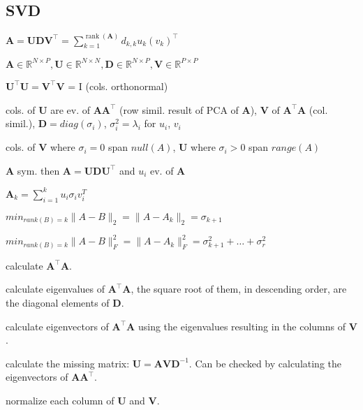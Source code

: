 \documentclass[a4paper, 11pt, landscape]{article}
\begin{document}
\begin{multicols*}{3}
    \section{SVD}
    \begin{inparaitem}[\color{red}\textbullet]
    \item $\mathbf{A} = \mathbf{U} \mathbf{D} \mathbf{V}^\top = \sum_{k=1}^{\operatorname{rank}(\mathbf{A})} d_{k,k} u_k (v_k)^\top$
    \item $\mathbf{A} \in \mathbb{R}^{N \times P}, \mathbf{U} \in \mathbb{R}^{N \times N}, \mathbf{D} \in \mathbb{R}^{N \times P}, \mathbf{V} \in \mathbb{R}^{P \times P}$
    \item $\mathbf{U}^\top \mathbf{U} = \mathbf{V}^\top \mathbf{V}$ = I (cols. orthonormal)
    \item cols. of $\mathbf{U}$ are ev. of $\mathbf{A}\mathbf{A}^\top$ (row simil. result of PCA of $\mathbf{A}$), $\mathbf{V}$ of $\mathbf{A}^\top\mathbf{A}$ (col. simil.), 
        $\mathbf{D} = diag(\sigma_i)$, $\sigma_i^2 = \lambda_i$ for $u_i$, $v_i$  
    \item cols. of $\mathbf{V}$ where $\sigma_i = 0$ span $null(A)$, $\mathbf{U}$ where $\sigma_i > 0$ span $range(A)$
    \item $\mathbf{A}$ sym. then $\mathbf{A} = \mathbf{U} \mathbf{D} \mathbf{U}^\top$ and $u_i$ ev. of $\mathbf{A}$
    \item $\mathbf{A}_k = \sum_{i=1}^k u_i \sigma_i v_i^T$
    \item $min_{rank(B)=k}\|A-B\|_2 = \|A-A_k\|_2 = \sigma_{k+1}$
    \item $min_{rank(B)=k}\|A-B\|_F^2 = \|A-A_k\|_F^2 = \sigma_{k+1}^2 + \dots + \sigma_{r}^2$
    \end{inparaitem}

    \begin{compactenum}
    \item calculate $\mathbf{A}^\top \mathbf{A}$.
    \item calculate eigenvalues of $\mathbf{A}^\top \mathbf{A}$, the square root of them, in descending order, are the diagonal elements of $\mathbf{D}$.
    \item calculate eigenvectors of $\mathbf{A}^\top \mathbf{A}$ using the eigenvalues resulting in the columns of $\mathbf{V}$.
    \item calculate the missing matrix: $\mathbf{U} = \mathbf{A} \mathbf{V} \mathbf{D}^{-1}$. Can be checked by calculating the eigenvectors of $\mathbf{A} \mathbf{A}^\top$.
    \item normalize each column of $\mathbf{U}$ and $\mathbf{V}$.
    \end{compactenum}


\end{multicols*}
\end{document}
